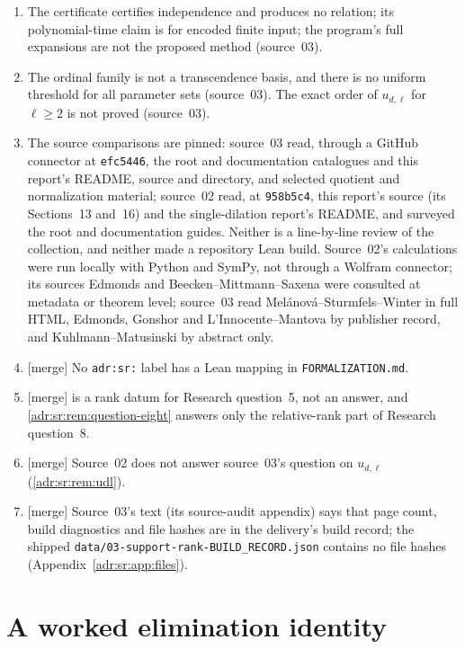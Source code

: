 \documentclass[11pt,letterpaper]{article}
\numberwithin{equation}{section}
\theoremstyle{definition}
\theoremstyle{remark}
\newcommand{\rpath}[1]{\nolinkurl{#1}}%
\newcommand{\mtag}{\textup{[merge]}}%
\begin{document}
\begin{enumerate}[label=R\arabic*.,leftmargin=2.6em,itemsep=2pt]
$\omega^{\sqrt2}$) (source~03).
\item The certificate certifies independence and produces no relation; its
polynomial-time claim is for encoded finite input; the program's full
expansions are not the proposed method (source~03).
\item The ordinal family is not a transcendence basis, and there is no uniform
threshold for all parameter sets (source~03). The exact order of $u_{d,\ell}$
for $\ell\ge2$ is not proved (source~03).
\item The source comparisons are pinned: source~03 read, through a GitHub
connector at \texttt{efc5446}, the root and documentation catalogues and this
report's README, source and directory, and selected quotient and normalization
material; source~02 read, at \texttt{958b5c4}, this report's source (its
Sections~13 and~16) and the single-dilation report's README, and surveyed the
root and documentation guides. Neither is a line-by-line review of the
collection, and neither made a repository Lean build. Source~02's calculations
were run locally with Python and SymPy, not through a Wolfram connector; its
sources Edmonds and Beecken--Mittmann--Saxena were consulted at metadata or
theorem level; source~03 read Mel\'anov\'a--Sturmfels--Winter in full HTML,
Edmonds, Gonshor and L'Innocente--Mantova by publisher record, and
Kuhlmann--Matusinski by abstract only.
\item \mtag{} No \texttt{adr:sr:} label has a Lean mapping in
\rpath{FORMALIZATION.md}.
\item \mtag{}  is a rank datum for Research
question~5, not an answer, and \cref{adr:sr:rem:question-eight} answers only
the relative-rank part of Research question~8.
\item \mtag{} Source~02 does not answer source~03's question on $u_{d,\ell}$
(\cref{adr:sr:rem:udl}).
\item \mtag{} Source~03's text (its source-audit appendix) says that page
count, build diagnostics and file hashes are in the delivery's build record;
the shipped \rpath{data/03-support-rank-BUILD_RECORD.json} contains no file
hashes (Appendix~\ref{adr:sr:app:files}).
\end{enumerate}

\appendix
\section{A worked elimination identity}\label{adr:app:elimination}
\end{document}
